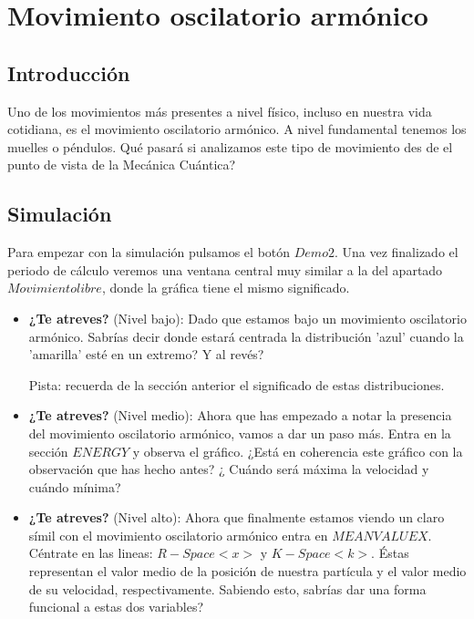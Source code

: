 \section{Movimiento oscilatorio arm\'onico}

\subsection{Introducci\'on}
Uno de los movimientos m\'as presentes a nivel f\'isico, incluso en nuestra vida cotidiana, es el movimiento oscilatorio arm\'onico. A nivel fundamental tenemos los muelles o p\'endulos. Qu\'e pasar\'a si analizamos este tipo de movimiento des de el punto de vista de la Mec\'anica Cu\'antica?

\subsection{Simulaci\'on}
Para empezar con la simulaci\'on pulsamos el bot\'on $Demo 2$. Una vez finalizado el periodo de c\'alculo veremos una ventana central muy similar a la del apartado $Movimiento libre$, donde la gr\'afica tiene el mismo significado. 

\begin{itemize}
	\item \textbf{¿Te atreves?} (Nivel bajo): Dado que estamos bajo un movimiento oscilatorio armónico. Sabr\'ias decir donde estar\'a centrada la distribuci\'on 'azul' cuando la 'amarilla' est\'e en un extremo? Y al rev\'es? 
	
	Pista: recuerda de la secci\'on anterior el significado de estas distribuciones.
\end{itemize}

\begin{itemize}
	\item \textbf{¿Te atreves?} (Nivel medio): Ahora que has empezado a notar la presencia del movimiento oscilatorio arm\'onico, vamos a dar un paso m\'as. Entra en la secci\'on $ENERGY$ y observa el gr\'afico. ¿Est\'a en coherencia este gr\'afico con la observaci\'on que has hecho antes? ¿ Cu\'ando ser\'a m\'axima la velocidad y cu\'ando m\'inima?
\end{itemize}

\begin{itemize}
	\item \textbf{¿Te atreves?} (Nivel alto): Ahora que finalmente estamos viendo un claro s\'imil con el movimiento oscilatorio arm\'onico entra en $MEAN VALUE X$. C\'entrate en las lineas: $R-Space <x>$ y $K-Space <k>$. \'Estas representan el valor medio de la posici\'on de nuestra part\'icula y el valor medio de su velocidad, respectivamente. Sabiendo esto, sabr\'ias dar una forma funcional a estas dos variables?
\end{itemize}

